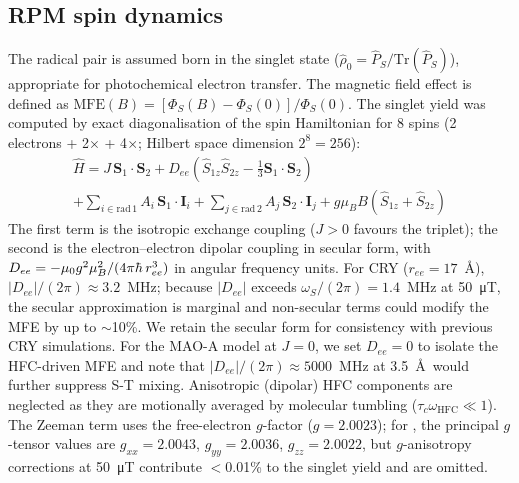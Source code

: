 \documentclass[twoside,twocolumn,9pt]{article}
\newcommand{\myhbar}{\mathchar'26\mkern-9mu h}
\begin{document}
\subsection{RPM spin dynamics}

The radical pair is assumed born in the singlet state ($\hat{\rho}_0 = \hat{P}_S/\mathrm{Tr}(\hat{P}_S)$), appropriate for photochemical electron transfer.\cite{Steiner1989} The magnetic field effect is defined as $\mathrm{MFE}(B) = [\Phi_S(B) - \Phi_S(0)]/\Phi_S(0)$. The singlet yield was computed by exact diagonalisation of the spin Hamiltonian for 8 spins (2 electrons + 2$\times$ + 4$\times$; Hilbert space dimension $2^8 = 256$):
\begin{multline}
\hat{H} = J\,\mathbf{S}_1 \cdot \mathbf{S}_2 + D_{ee}\!\left(\hat{S}_{1z}\hat{S}_{2z} - \tfrac{1}{3}\mathbf{S}_1\!\cdot\!\mathbf{S}_2\right) \\
+ \sum_{i \in \mathrm{rad}\,1}\! A_i\,\mathbf{S}_1 \!\cdot\! \mathbf{I}_i + \sum_{j \in \mathrm{rad}\,2}\! A_j\,\mathbf{S}_2 \!\cdot\! \mathbf{I}_j + g\mu_B B(\hat{S}_{1z} + \hat{S}_{2z})
\label{eq:H}
\end{multline}
The first term is the isotropic exchange coupling ($J > 0$ favours the triplet); the second is the electron--electron dipolar coupling in secular form, with $D_{ee} = -\mu_0 g^{2}\mu_B^{2}/(4\pi\myhbar\, r_{ee}^{3})$ in angular frequency units. For CRY ($r_{ee} = 17$~\AA), $|D_{ee}|/(2\pi) \approx 3.2$~MHz; because $|D_{ee}|$ exceeds $\omega_S/(2\pi) = 1.4$~MHz at 50~\si{\micro\tesla}, the secular approximation is marginal and non-secular terms could modify the MFE by up to $\sim$10\%.\cite{Hiscock2016} We retain the secular form for consistency with previous CRY simulations. For the MAO-A model at $J = 0$, we set $D_{ee} = 0$ to isolate the HFC-driven MFE and note that $|D_{ee}|/(2\pi) \approx 5000$~MHz at 3.5~\AA\ would further suppress S-T mixing. Anisotropic (dipolar) HFC components are neglected as they are motionally averaged by molecular tumbling ($\tau_c \omega_\mathrm{HFC} \ll 1$). The Zeeman term uses the free-electron $g$-factor ($g = 2.0023$); for , the principal $g$-tensor values are $g_{xx} = 2.0043$, $g_{yy} = 2.0036$, $g_{zz} = 2.0022$,\cite{Weber1998} but $g$-anisotropy corrections at 50~\si{\micro\tesla} contribute $<$0.01\% to the singlet yield and are omitted.
\end{document}
